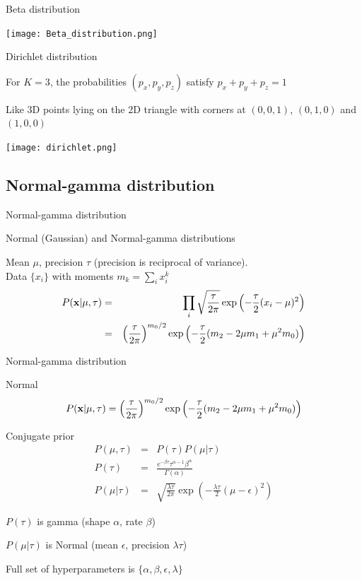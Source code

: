 \documentclass{beamer}
\begin{document}
\begin{frame}{Beta distribution}

  \texttt{[image: Beta\_distribution.png]}

\end{frame}

\begin{frame}{Dirichlet distribution}

\itemb
\item
For $K=3$,
the probabilities $(p_x,p_y,p_z)$
satisfy $p_x+p_y+p_z=1$
\item Like 3D points lying on the 2D triangle
with corners at $(0,0,1)$, $(0,1,0)$ and $(1,0,0)$
\iteme

  \texttt{[image: dirichlet.png]}

\end{frame}

\subsection{Normal-gamma distribution}

\begin{frame}{Normal-gamma distribution}

\itemb
\item Normal (Gaussian) and Normal-gamma distributions
 \itemb
 \item Mean $\mu$, precision $\tau$ (precision is reciprocal of variance). \\
Data $\{x_i\}$ with moments $m_k = \sum_i x_i^k$
\begin{eqnarray*}
P({\bf x}|\mu,\tau)
& = & \prod_i \sqrt{\frac{\tau}{2\pi}} \exp \left( -\frac{\tau}{2}(x_i-\mu)^2 \right) \\
& = & \left(\frac{\tau}{2\pi}\right)^{m_0/2} \exp \left( -\frac{\tau}{2} (m_2 - 2\mu m_1 + \mu^2 m_0) \right)
\end{eqnarray*}
\iteme
\iteme

\end{frame}

\begin{frame}{Normal-gamma distribution}

\itemb
\item Normal
\[
P({\bf x}|\mu,\tau)
= \left(\frac{\tau}{2\pi}\right)^{m_0/2} \exp \left( -\frac{\tau}{2} (m_2 - 2\mu m_1 + \mu^2 m_0) \right)
\]
 \item Conjugate prior
\begin{eqnarray*}
P(\mu,\tau) & = & P(\tau) P(\mu|\tau) \\
P(\tau) & = & \frac{e^{-\beta \tau} \tau^{\alpha-1} \beta^\alpha}{\Gamma(\alpha)} \\
P(\mu|\tau) & = & \sqrt{\frac{\lambda \tau}{2\pi}} \exp\left( -\frac{\lambda \tau}{2}(\mu-\epsilon)^2 \right)
\end{eqnarray*}
\item $P(\tau)$ is gamma (shape $\alpha$, rate $\beta$)
\item $P(\mu|\tau)$ is Normal (mean $\epsilon$, precision $\lambda \tau$)
\item Full set of hyperparameters is $\{ \alpha, \beta, \epsilon, \lambda \}$
\iteme

\end{frame}
\end{document}
